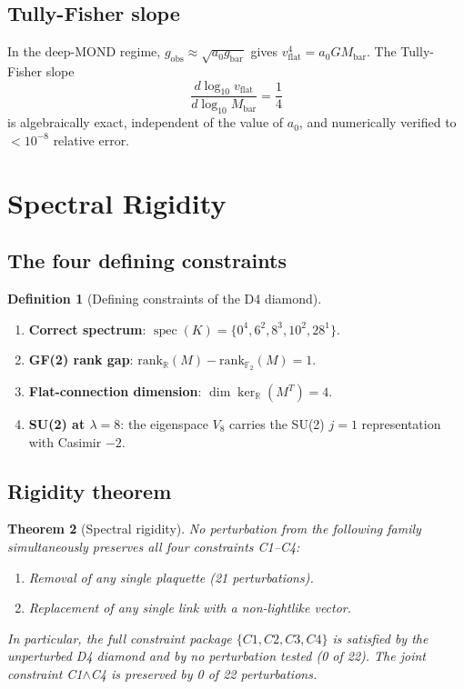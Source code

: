 \documentclass[12pt,a4paper]{article}
\theoremstyle{plain}
\newtheorem{theorem}{Theorem}[section]
\theoremstyle{definition}
\newtheorem{definition}[theorem]{Definition}
\newcommand{\R}{\mathbb{R}}
\newcommand{\GF}[1]{\mathbb{F}_{#1}}
\newcommand{\rank}{\mathrm{rank}}
\DeclareMathOperator{\spec}{spec}
\begin{document}
\subsection{Tully-Fisher slope}

In the deep-MOND regime, $g_{\mathrm{obs}} \approx \sqrt{a_0 g_{\mathrm{bar}}}$
gives $v_{\mathrm{flat}}^4 = a_0 G M_{\mathrm{bar}}$.  The Tully-Fisher slope
\begin{equation}
  \frac{d\log_{10}v_{\mathrm{flat}}}{d\log_{10} M_{\mathrm{bar}}} = \frac{1}{4}
\end{equation}
is algebraically exact, independent of the value of $a_0$, and
numerically verified to $< 10^{-8}$ relative error.

\section{Spectral Rigidity}
\label{sec:rigidity}

\subsection{The four defining constraints}

\begin{definition}[Defining constraints of the D4 diamond]
  \label{def:constraints}
  \begin{enumerate}[label=C\arabic*.]
    \item \textbf{Correct spectrum}: $\spec(K) = \{0^4, 6^2, 8^3, 10^2, 28^1\}$.
    \item \textbf{GF(2) rank gap}: $\rank_\R(M) - \rank_{\GF{2}}(M) = 1$.
    \item \textbf{Flat-connection dimension}: $\dim\ker_\R(M^T) = 4$.
    \item \textbf{SU(2) at $\lambda=8$}: the eigenspace $V_8$ carries
      the SU(2) $j=1$ representation with Casimir $-2$.
  \end{enumerate}
\end{definition}

\subsection{Rigidity theorem}

\begin{theorem}[Spectral rigidity]
\label{thm:rigidity}
  No perturbation from the following family simultaneously preserves
  all four constraints C1--C4:
  \begin{enumerate}[label=P\arabic*.]
    \item Removal of any single plaquette (21 perturbations).
    \item Replacement of any single link with a non-lightlike vector.
  \end{enumerate}
  In particular, the full constraint package $\{C1, C2, C3, C4\}$ is
  satisfied by the unperturbed D4 diamond and by no perturbation tested
  (0 of 22).  The joint constraint C1$\wedge$C4 is preserved by 0 of 22
  perturbations.
\end{theorem}
\end{document}
